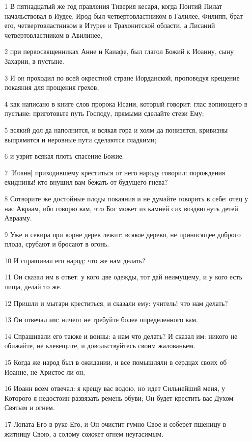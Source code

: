 \par 1 В пятнадцатый же год правления Тиверия кесаря, когда Понтий Пилат начальствовал в Иудее, Ирод был четвертовластником в Галилее, Филипп, брат его, четвертовластником в Итурее и Трахонитской области, а Лисаний четвертовластником в Авилинее,
\par 2 при первосвященниках Анне и Каиафе, был глагол Божий к Иоанну, сыну Захарии, в пустыне.
\par 3 И он проходил по всей окрестной стране Иорданской, проповедуя крещение покаяния для прощения грехов,
\par 4 как написано в книге слов пророка Исаии, который говорит: глас вопиющего в пустыне: приготовьте путь Господу, прямыми сделайте стези Ему;
\par 5 всякий дол да наполнится, и всякая гора и холм да понизятся, кривизны выпрямятся и неровные пути сделаются гладкими;
\par 6 и узрит всякая плоть спасение Божие.
\par 7 [Иоанн] приходившему креститься от него народу говорил: порождения ехиднины! кто внушил вам бежать от будущего гнева?
\par 8 Сотворите же достойные плоды покаяния и не думайте говорить в себе: отец у нас Авраам, ибо говорю вам, что Бог может из камней сих воздвигнуть детей Аврааму.
\par 9 Уже и секира при корне дерев лежит: всякое дерево, не приносящее доброго плода, срубают и бросают в огонь.
\par 10 И спрашивал его народ: что же нам делать?
\par 11 Он сказал им в ответ: у кого две одежды, тот дай неимущему, и у кого есть пища, делай то же.
\par 12 Пришли и мытари креститься, и сказали ему: учитель! что нам делать?
\par 13 Он отвечал им: ничего не требуйте более определенного вам.
\par 14 Спрашивали его также и воины: а нам что делать? И сказал им: никого не обижайте, не клевещите, и довольствуйтесь своим жалованьем.
\par 15 Когда же народ был в ожидании, и все помышляли в сердцах своих об Иоанне, не Христос ли он, --
\par 16 Иоанн всем отвечал: я крещу вас водою, но идет Сильнейший меня, у Которого я недостоин развязать ремень обуви; Он будет крестить вас Духом Святым и огнем.
\par 17 Лопата Его в руке Его, и Он очистит гумно Свое и соберет пшеницу в житницу Свою, а солому сожжет огнем неугасимым.
